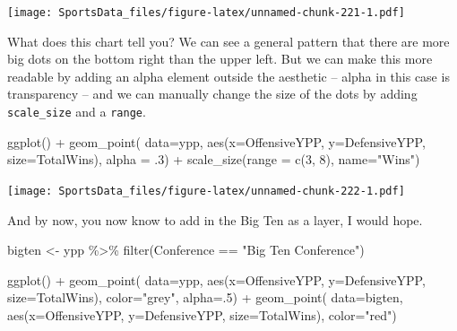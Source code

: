 \documentclass[
]{book}
\newenvironment{Shaded}{\begin{snugshade}}{\end{snugshade}}
\newcommand{\AttributeTok}[1]{\textcolor[rgb]{0.77,0.63,0.00}{#1}}
\newcommand{\DecValTok}[1]{\textcolor[rgb]{0.00,0.00,0.81}{#1}}
\newcommand{\FunctionTok}[1]{\textcolor[rgb]{0.00,0.00,0.00}{#1}}
\newcommand{\NormalTok}[1]{#1}
\newcommand{\OtherTok}[1]{\textcolor[rgb]{0.56,0.35,0.01}{#1}}
\newcommand{\SpecialCharTok}[1]{\textcolor[rgb]{0.00,0.00,0.00}{#1}}
\newcommand{\StringTok}[1]{\textcolor[rgb]{0.31,0.60,0.02}{#1}}
\begin{document}
\texttt{[image: SportsData\_files/figure-latex/unnamed-chunk-221-1.pdf]}

What does this chart tell you? We can see a general pattern that there are more big dots on the bottom right than the upper left. But we can make this more readable by adding an alpha element outside the aesthetic -- alpha in this case is transparency -- and we can manually change the size of the dots by adding \texttt{scale\_size} and a \texttt{range}.

\begin{Shaded}
\begin{Highlighting}[]
\FunctionTok{ggplot}\NormalTok{() }\SpecialCharTok{+} 
  \FunctionTok{geom\_point}\NormalTok{(}
    \AttributeTok{data=}\NormalTok{ypp, }
    \FunctionTok{aes}\NormalTok{(}\AttributeTok{x=}\NormalTok{OffensiveYPP, }\AttributeTok{y=}\NormalTok{DefensiveYPP, }\AttributeTok{size=}\NormalTok{TotalWins),}
    \AttributeTok{alpha =}\NormalTok{ .}\DecValTok{3}\NormalTok{) }\SpecialCharTok{+} 
  \FunctionTok{scale\_size}\NormalTok{(}\AttributeTok{range =} \FunctionTok{c}\NormalTok{(}\DecValTok{3}\NormalTok{, }\DecValTok{8}\NormalTok{), }\AttributeTok{name=}\StringTok{"Wins"}\NormalTok{)}
\end{Highlighting}
\end{Shaded}

\texttt{[image: SportsData\_files/figure-latex/unnamed-chunk-222-1.pdf]}

And by now, you now know to add in the Big Ten as a layer, I would hope.

\begin{Shaded}
\begin{Highlighting}[]
\NormalTok{bigten }\OtherTok{\textless{}{-}}\NormalTok{ ypp }\SpecialCharTok{\%\textgreater{}\%} \FunctionTok{filter}\NormalTok{(Conference }\SpecialCharTok{==} \StringTok{"Big Ten Conference"}\NormalTok{)}
\end{Highlighting}
\end{Shaded}

\begin{Shaded}
\begin{Highlighting}[]
\FunctionTok{ggplot}\NormalTok{() }\SpecialCharTok{+} 
  \FunctionTok{geom\_point}\NormalTok{(}
    \AttributeTok{data=}\NormalTok{ypp, }
    \FunctionTok{aes}\NormalTok{(}\AttributeTok{x=}\NormalTok{OffensiveYPP, }\AttributeTok{y=}\NormalTok{DefensiveYPP, }\AttributeTok{size=}\NormalTok{TotalWins), }
    \AttributeTok{color=}\StringTok{"grey"}\NormalTok{, }
    \AttributeTok{alpha=}\NormalTok{.}\DecValTok{5}\NormalTok{) }\SpecialCharTok{+} 
  \FunctionTok{geom\_point}\NormalTok{(}
    \AttributeTok{data=}\NormalTok{bigten, }
    \FunctionTok{aes}\NormalTok{(}\AttributeTok{x=}\NormalTok{OffensiveYPP, }\AttributeTok{y=}\NormalTok{DefensiveYPP, }\AttributeTok{size=}\NormalTok{TotalWins), }
    \AttributeTok{color=}\StringTok{"red"}\NormalTok{)}
\end{Highlighting}
\end{Shaded}
\end{document}
